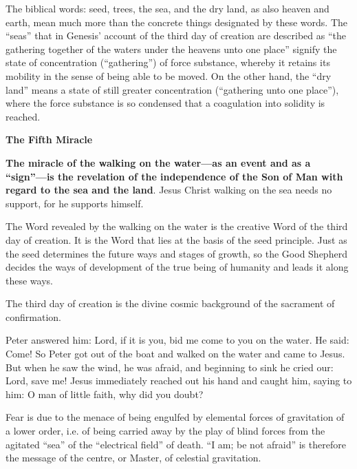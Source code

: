 \begin{quotex}
The biblical words: seed, trees, the sea, and the dry land, as also heaven and earth, mean much more than the concrete things designated by these words. The ``seas'' that in Genesis' account of the third day of creation are described as ``the gathering together of the waters under the heavens unto one place'' signify the state of concentration (``gathering'') of force substance, whereby it retains its mobility in the sense of being able to be moved. On the other hand, the ``dry land'' means a state of still greater concentration (``gathering unto one place''), where the force substance is so condensed that a coagulation into solidity is reached.

\end{quotex}
\textbf{The Fifth Miracle}

\textbf{The miracle of the walking on the water—as an event and as a ``sign''—is the revelation of the independence of the Son of Man with regard to the sea and the land}. Jesus Christ walking on the sea needs no support, for he supports himself.

The Word revealed by the walking on the water is the creative Word of the third day of creation. It is the Word that lies at the basis of the seed principle. Just as the seed determines the future ways and stages of growth, so the Good Shepherd decides the ways of development of the true being of humanity and leads it along these ways.

\begin{quotex}
The third day of creation is the divine cosmic background of the sacrament of confirmation.

\end{quotex}
Peter answered him: Lord, if it is you, bid me come to you on the water. He said: Come! So Peter got out of the boat and walked on the water and came to Jesus. But when he saw the wind, he was afraid, and beginning to sink he cried our: Lord, save me! Jesus immediately reached out his hand and caught him, saying to him: O man of little faith, why did you doubt?

Fear is due to the menace of being engulfed by elemental forces of gravitation of a lower order, i.e. of being carried away by the play of blind forces from the agitated ``sea'' of the ``electrical field'' of death. ``I am; be not afraid'' is therefore the message of the centre, or Master, of celestial gravitation.

